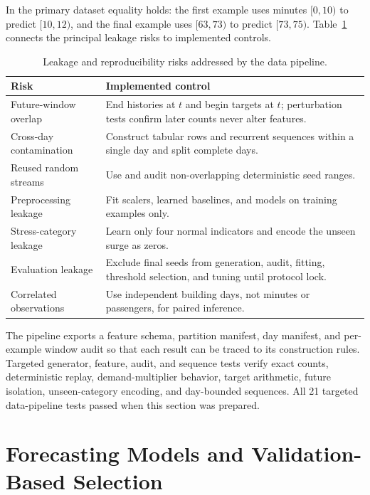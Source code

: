 \documentclass[12pt]{article}
\begin{document}
In the primary dataset equality holds: the first example uses minutes
$[0,10)$ to predict $[10,12)$, and the final example uses $[63,73)$ to predict
$[73,75)$. Table~\ref{tab:leakage-controls} connects the principal leakage
risks to implemented controls.

\begin{table}[H]
  \centering
  \caption{Leakage and reproducibility risks addressed by the data pipeline.}
  \label{tab:leakage-controls}
  \begin{tabular}{@{}>{\raggedright\arraybackslash}p{}
    >{\raggedright\arraybackslash}p{}@{}}
    \toprule
    Risk & Implemented control \\
    \midrule
    Future-window overlap & End histories at $t$ and begin targets at $t$;
      perturbation tests confirm later counts never alter features. \\
    Cross-day contamination & Construct tabular rows and recurrent sequences
      within a single day and split complete days. \\
    Reused random streams & Use and audit non-overlapping deterministic seed
      ranges. \\
    Preprocessing leakage & Fit scalers, learned baselines, and models on
      training examples only. \\
    Stress-category leakage & Learn only four normal indicators and encode the
      unseen surge as zeros. \\
    Evaluation leakage & Exclude final seeds from generation, audit, fitting,
      threshold selection, and tuning until protocol lock. \\
    Correlated observations & Use independent building days, not minutes or
      passengers, for paired inference. \\
    \bottomrule
  \end{tabular}
\end{table}

The pipeline exports a feature schema, partition manifest, day manifest, and
per-example window audit so that each result can be traced to its construction
rules. Targeted generator, feature, audit, and sequence tests verify exact
counts, deterministic replay, demand-multiplier behavior, target arithmetic,
future isolation, unseen-category encoding, and day-bounded sequences. All 21
targeted data-pipeline tests passed when this section was prepared.

\section{Forecasting Models and Validation-Based Selection}
\label{sec:forecasting-models}
\end{document}
